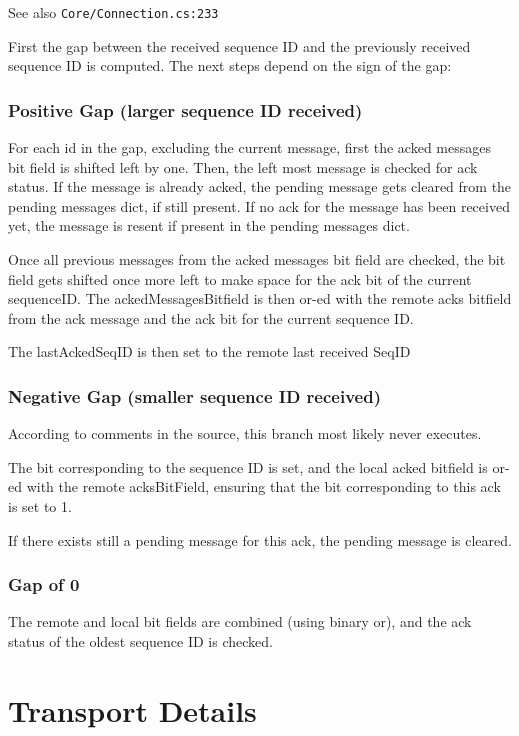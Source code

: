 See also \texttt{Core/Connection.cs:233}

First the gap between the received sequence ID and the previously received sequence ID is computed. The next steps depend on the sign of the gap:

\subsubsection{Positive Gap (larger sequence ID received)}

For each id in the gap, excluding the current message, first the acked messages bit field is shifted left by one. Then, the left most message is checked for ack status. If the message is already acked, the pending message gets cleared from the pending messages dict, if still present. If no ack for the message has been received yet, the message is resent if present in the pending messages dict.

Once all previous messages from the acked messages bit field are checked, the bit field gets shifted once more left to make space for the ack bit of the current sequenceID. The ackedMessagesBitfield is then or-ed with the remote acks bitfield from the ack message and the ack bit for the current sequence ID.

The lastAckedSeqID is then set to the remote last received SeqID

\subsubsection{Negative Gap (smaller sequence ID received)}

According to comments in the source, this branch most likely never executes.

The bit corresponding to the sequence ID is set, and the local acked bitfield is or-ed with the remote acksBitField, ensuring that the bit corresponding to this ack is set to 1. 

If there exists still a pending message for this ack, the pending message is cleared.

\subsubsection{Gap of 0}

The remote and local bit fields are combined (using binary or), and the ack status of the oldest sequence ID is checked.

\section{Transport Details}

